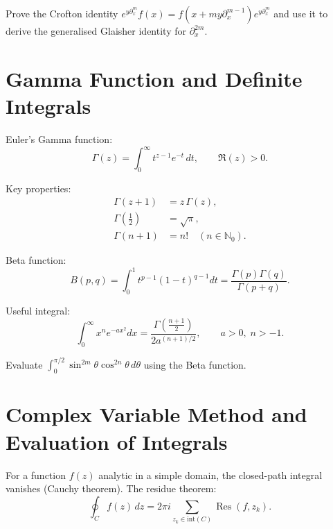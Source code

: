 \begin{exercise}
Prove the Crofton identity $e^{y\partial_x^m}f(x)=f(x+my\partial_x^{m-1})e^{y\partial_x^m}$
and use it to derive the generalised Glaisher identity for $\partial_x^{2m}$.
\end{exercise}

\section{Gamma Function and Definite Integrals}

Euler's Gamma function:
\begin{equation}
\Gamma(z) = \int_0^\infty t^{z-1}e^{-t}\,dt, \qquad \Re(z)>0.
\label{eq:6.3.1}
\end{equation}

Key properties:
\begin{align}
\Gamma(z+1) &= z\,\Gamma(z),\\
\Gamma(\tfrac12) &= \sqrt{\pi},\\
\Gamma(n+1) &= n! \quad (n\in\mathbb N_0).
\label{eq:6.3.2}
\end{align}

Beta function:
\begin{equation}
B(p,q) = \int_0^1 t^{p-1}(1-t)^{q-1}dt
= \frac{\Gamma(p)\Gamma(q)}{\Gamma(p+q)}.
\label{eq:6.3.3}
\end{equation}

Useful integral:
\begin{equation}
\int_0^\infty x^{n}e^{-ax^2}dx =
\frac{\Gamma\!\left(\frac{n+1}{2}\right)}{2a^{(n+1)/2}},
\qquad a>0,\;n>-1.
\label{eq:6.3.4}
\end{equation}

\begin{exercise}
Evaluate $\int_0^{\pi/2}\sin^{2m}\theta\cos^{2n}\theta\,d\theta$
using the Beta function.
\end{exercise}

\section{Complex Variable Method and Evaluation of Integrals}

For a function $f(z)$ analytic in a simple domain, the closed-path integral
vanishes (Cauchy theorem). The residue theorem:
\begin{equation}
\oint_C f(z)\,dz = 2\pi i\sum_{z_k\in\text{int}(C)} \operatorname{Res}(f,z_k).
\label{eq:6.4.1}
\end{equation}

